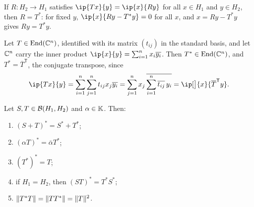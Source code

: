 \begin{remark}\label{rem:adjoint-unique}
If $R \colon H_2 \to H_1$ satisfies $\ip{Tx}{y} = \ip{x}{Ry}$ for all
$x \in H_1$ and $y \in H_2$, then $R = T^*$: for fixed $y$,
$\ip{x}{Ry - T^* y} = 0$ for all $x$, and $x = Ry - T^* y$ gives
$Ry = T^* y$.
\end{remark}

\begin{example}\label{ex:conj-transpose}
Let $T \in \operatorname{End}(\mathbb{C}^n)$, identified with its matrix $(t_{ij})$ in
the standard basis, and let $\mathbb{C}^n$ carry the inner product
$\ip{x}{y} = \sum_{i=1}^{n} x_i \overline{y_i}$. Then
$T^* \in \operatorname{End}(\mathbb{C}^n)$, and $T^* = \overline{T}^{\mathsf{T}}$,
the conjugate transpose, since
\[
  \ip{Tx}{y} = \sum_{i=1}^{n} \sum_{j=1}^{n} t_{ij} x_j \overline{y_i}
  = \sum_{j=1}^{n} x_j\, \overline{\sum_{i=1}^{n} \overline{t_{ij}}\, y_i}
  = \ip[\big]{x}{\overline{T}^{\mathsf{T}} y} .
\]
\end{example}

\begin{theorem}\label{thm:adjoint-properties}
Let $S, T \in \mathcal{B}(H_1, H_2)$ and $\alpha \in \mathbb{K}$. Then:
\begin{enumerate}
  \item $(S + T)^* = S^* + T^*$;
  \item $(\alpha T)^* = \bar{\alpha} T^*$;
  \item $(T^*)^* = T$;
  \item if $H_1 = H_2$, then $(ST)^* = T^* S^*$;
  \item $\lVert T^* T\rVert = \lVert T T^*\rVert = \lVert T\rVert^2$.
\end{enumerate}
\end{theorem}

